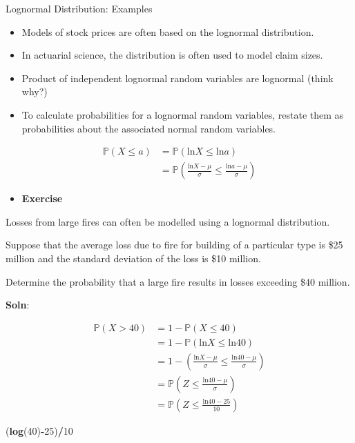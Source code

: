 \documentclass[ignorenonframetext,]{beamer}
\newenvironment{Shaded}{\begin{snugshade}}{\end{snugshade}}
\newcommand{\KeywordTok}[1]{\textcolor[rgb]{0.13,0.29,0.53}{\textbf{#1}}}
\newcommand{\DecValTok}[1]{\textcolor[rgb]{0.00,0.00,0.81}{#1}}
\newcommand{\OperatorTok}[1]{\textcolor[rgb]{0.81,0.36,0.00}{\textbf{#1}}}
\newcommand{\NormalTok}[1]{#1}
\providecommand{\tightlist}{%
  \setlength{\itemsep}{0pt}\setlength{\parskip}{0pt}}
\begin{document}
\begin{frame}[fragile]{Lognormal Distribution: Examples}

\begin{itemize}
\item
  Models of stock prices are often based on the lognormal distribution.
\item
  In actuarial science, the distribution is often used to model claim
  sizes.
\item
  Product of independent lognormal random variables are lognormal (think
  why?)
\item
  To calculate probabilities for a lognormal random variables, restate
  them as probabilities about the associated normal random variables.
\end{itemize}

\begin{align*}
\mathbb{P}(X\le a)&=\mathbb{P}(\text{ln}X\le\text{ln} a)\\
&=\mathbb{P}\left(\frac{\text{ln}X-\mu}{\sigma}\le\frac{\text{ln}a-\mu}{\sigma}\right)
\end{align*}

\begin{itemize}
\tightlist
\item
  \textbf{Exercise}
\end{itemize}

Losses from large fires can often be modelled using a lognormal
distribution.

Suppose that the average loss due to fire for building of a particular
type is \$25 million and the standard deviation of the loss is \$10
million.

Determine the probability that a large fire results in losses exceeding
\$40 million.

\textbf{Soln}:

\begin{align*}
\mathbb{P}(X> 40)&=1- \mathbb{P}(X\le 40)\\
&=1-\mathbb{P}(\text{ln}X\le\text{ln}40)\\
&=1-\left(\frac{\text{ln}X-\mu}{\sigma}\le \frac{\text{ln}40-\mu}{\sigma}\right)\\
&=\mathbb{P}(Z\le \frac{\text{ln}40-\mu}{\sigma})\\
&=\mathbb{P}(Z\le \frac{\text{ln}40-25}{10})
\end{align*}

\begin{Shaded}
\begin{Highlighting}[]
\NormalTok{(}\KeywordTok{log}\NormalTok{(}\DecValTok{40}\NormalTok{)}\OperatorTok{-}\DecValTok{25}\NormalTok{)}\OperatorTok{/}\DecValTok{10}
\end{Highlighting}
\end{Shaded}


\end{frame}
\end{document}
